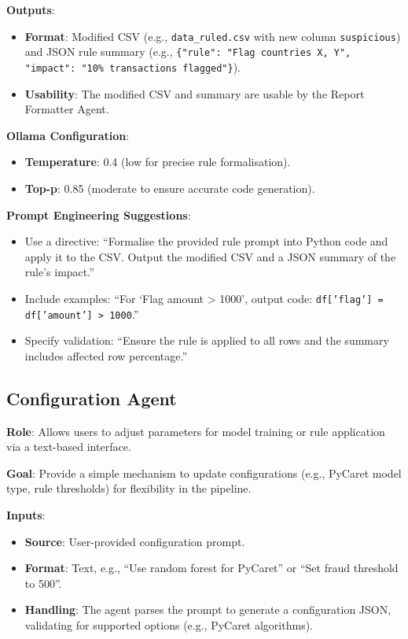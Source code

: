 \documentclass{article}
\begin{document}
\textbf{Outputs}:
\begin{itemize}[label=--]
    \item \textbf{Format}: Modified CSV (e.g., \texttt{data\_ruled.csv} with new column \texttt{suspicious}) and JSON rule summary (e.g., \texttt{\{"rule": "Flag countries X, Y", "impact": "10\% transactions flagged"\}}).
    \item \textbf{Usability}: The modified CSV and summary are usable by the Report Formatter Agent.
\end{itemize}

\textbf{Ollama Configuration}:
\begin{itemize}[label=--]
    \item \textbf{Temperature}: 0.4 (low for precise rule formalisation).
    \item \textbf{Top-p}: 0.85 (moderate to ensure accurate code generation).
\end{itemize}

\textbf{Prompt Engineering Suggestions}:
\begin{itemize}[label=--]
    \item Use a directive: “Formalise the provided rule prompt into Python code and apply it to the CSV. Output the modified CSV and a JSON summary of the rule’s impact.”
    \item Include examples: “For ‘Flag amount > 1000’, output code: \texttt{df['flag'] = df['amount'] > 1000}.”
    \item Specify validation: “Ensure the rule is applied to all rows and the summary includes affected row percentage.”
\end{itemize}

\subsection{Configuration Agent}

\textbf{Role}: Allows users to adjust parameters for model training or rule application via a text-based interface.

\textbf{Goal}: Provide a simple mechanism to update configurations (e.g., PyCaret model type, rule thresholds) for flexibility in the pipeline.

\textbf{Inputs}:
\begin{itemize}[label=--]
    \item \textbf{Source}: User-provided configuration prompt.
    \item \textbf{Format}: Text, e.g., “Use random forest for PyCaret” or “Set fraud threshold to 500”.
    \item \textbf{Handling}: The agent parses the prompt to generate a configuration JSON, validating for supported options (e.g., PyCaret algorithms).
\end{itemize}
\end{document}
